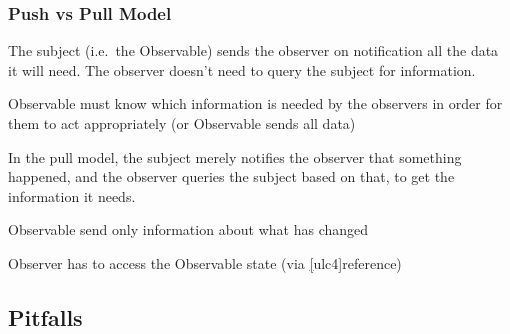 \subsubsection{Push vs Pull Model}
\begin{sectionbox}\nospacing
  \begin{itemizenosep}
      \item The subject (i.e.\ the Observable) sends the observer on notification all the data it will need.
      The observer doesn't need to query the subject for information.
      \item Observable must know which information is needed by the observers
      in order for them to act appropriately (or Observable sends all data)
  \end{itemizenosep}
\end{sectionbox}
\begin{sectionbox}\nospacing
  \begin{itemizenosep}
      \item 
      In the pull model, the subject merely notifies the observer that something
      happened, and the observer queries the subject based on that, to get the information it needs.
      \item Observable send only information about what has changed
      \item Observer has to access the Observable state (via \ul[ulc4]{reference})
  \end{itemizenosep}
\end{sectionbox}
\subsection*{Pitfalls}
\label{subsubsec:Pitfalls}

